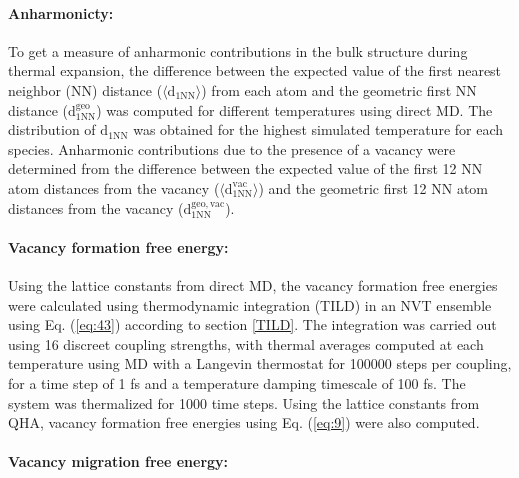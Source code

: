 \documentclass{article}
\begin{document}
\paragraph*{Anharmonicty:}

To get a measure of anharmonic contributions in the bulk structure during thermal expansion, the difference between the expected value of the first nearest neighbor (NN) distance ($\langle \mathrm{d_{1NN}} \rangle$) from each atom and the geometric first NN distance ($\mathrm{d_{1NN}^{geo}}$) was computed for different temperatures using direct MD. The distribution of $\mathrm{d_{1NN}}$ was obtained for the highest simulated temperature for each species. Anharmonic contributions due to the presence of a vacancy were determined from the difference between the expected value of the first 12 NN atom distances from the vacancy ($\langle \mathrm{d_{1NN}^{vac}} \rangle$) and the geometric first 12 NN atom distances from the vacancy ($\mathrm{d_{1NN}^{geo, vac}}$).

\paragraph*{Vacancy formation free energy:}

Using the lattice constants from direct MD, the vacancy formation free energies were calculated using thermodynamic integration (TILD) in an NVT ensemble using Eq. (\ref{eq:43}) according to section \ref{TILD}. The integration was carried out using 16 discreet coupling strengths, with thermal averages computed at each temperature using MD with a Langevin thermostat for 100000 steps per coupling, for a time step of 1 fs and a temperature damping timescale of 100 fs. The system was thermalized for 1000 time steps. Using the lattice constants from QHA, vacancy formation free energies using Eq. (\ref{eq:9}) were also computed.

\paragraph*{Vacancy migration free energy:}
\end{document}
